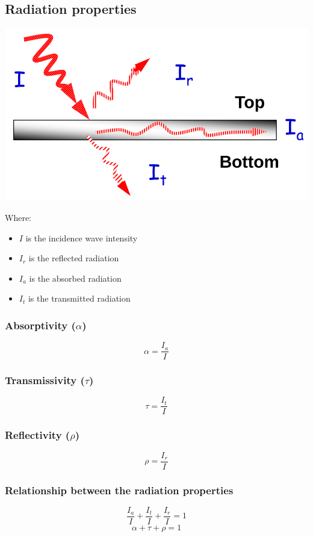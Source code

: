 \documentclass[11pt]{article}
\begin{document}
\subsection{Radiation properties}
\label{sec:org6efc79e}
\begin{center}
\includegraphics[width=.9\linewidth]{./images/radiation-properties.png}
\end{center}

Where:
\begin{itemize}
\item \(I\) is the incidence wave intensity
\item \(I_r\) is the reflected radiation
\item \(I_a\) is the absorbed radiation
\item \(I_t\) is the transmitted radiation
\end{itemize}

\subsubsection{Absorptivity (\(\alpha\))}
\label{sec:org5444654}
\[\alpha = \frac{I_a}{I}\]

\subsubsection{Transmissivity (\(\tau\))}
\label{sec:org6ee7284}
\[\tau = \frac{I_t}{I}\]

\subsubsection{Reflectivity (\(\rho\))}
\label{sec:orgb2fff02}
\[\rho = \frac{I_r}{I}\]

\subsubsection{Relationship between the radiation properties}
\label{sec:org798da0a}
\[\frac{I_a}{I} + \frac{I_t}{I} + \frac{I_r}{I} = 1\]
\[\alpha + \tau + \rho = 1\]
\end{document}
